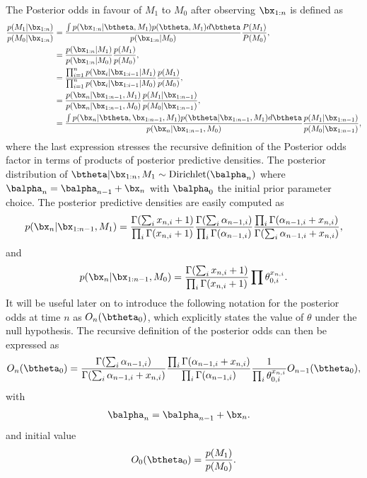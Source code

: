 \documentclass[11pt]{article}
\begin{document}
The Posterior odds in favour of $M_1$ to $M_0$ after observing $\bx_{1:n}$ is defined as
\begin{align}
  \label{eq:general_posterior_odds}
  \frac{p(M_1|\bx_{1:n})}{p(M_0|\bx_{1:n})}  &= \frac{\int p(\bx_{1:n}|\btheta,M_1)p(\btheta,M_1)d\btheta}{p(\bx_{1:n}|M_0)}\frac{P(M_1)}{P(M_0)},\\
                      &=\frac{p(\bx_{1:n}|M_1)}{p(\bx_{1:n}|M_0)}\frac{p(M_1)}{p(M_0)},\\
                      &=\frac{\prod_{i=1}^{n}p(\bx_i|\bx_{1:i-1}|M_1)}{\prod_{i=1}^{n}p(\bx_i|\bx_{1:i-1}|M_0)}\frac{p(M_1)}{p(M_0)},\\
                      &=\frac{p(\bx_n|\bx_{1:n-1},M_1)}{p(\bx_n|\bx_{1:n-1},M_0)} \frac{p(M_1|\bx_{1:n-1})}{p(M_0|\bx_{1:n-1})},\\
    &=\frac{\int p(\bx_n|\btheta,\bx_{1:n-1},M_1)p(\btheta|\bx_{1:n-1},M_1)d\btheta}{p(\bx_n|\bx_{1:n-1},M_0)}  \frac{p(M_1|\bx_{1:n-1})}{p(M_0|\bx_{1:n-1})} ,
\end{align}
where the last expression stresses the recursive definition of the Posterior odds factor in terms of products of posterior predictive densities.
The posterior distribution of $\btheta| \bx_{1:n}, M_1 \sim \text{Dirichlet}(\balpha_n)$ where $\balpha_n = \balpha_{n-1}+\bx_n$ with $\balpha_0$ the initial prior parameter choice.
The posterior predictive densities are easily computed as
\begin{equation}
  \label{eq:posterior_predictive_m1}
   p(\bx_n|\bx_{1:n-1},M_1) = \frac{ \Gamma(\sum_i x_{n,i}+ 1)}{\prod_i \Gamma(x_{n,i} + 1)} \frac{\Gamma(\sum_i \alpha_{n-1,i})}{\prod_i \Gamma(\alpha_{n-1,i})} \frac{\prod_i \Gamma(\alpha_{n-1,i} + x_{n,i})}{\Gamma(\sum_i \alpha_{n-1,i} + x_{n,i})},
\end{equation}
and
\begin{equation}
  \label{eq:posterior_predictive_m2}
   p(\bx_n|\bx_{1:n-1},M_0) = \frac{ \Gamma(\sum_i x_{n,i} + 1)}{\prod_i \Gamma(x_{n,i} + 1)} \prod \theta_{0,i}^{x_{n,i}}.
 \end{equation}
 It will be useful later on to introduce the following notation for the posterior odds at time $n$ as $O_n(\btheta_0)$, which explicitly states the value of $\theta$ under the null hypothesis.
The recursive definition of the posterior odds can then be expressed as
\begin{align}
  O_{n}(\btheta_0) &= \frac{\Gamma(\sum_i \alpha_{n-1,i})}{\Gamma(\sum_i \alpha_{n-1,i} +  x_{n,i})} \frac{\prod_i \Gamma(\alpha_{n-1,i} + x_{n,i})}{\prod_i \Gamma(\alpha_{n-1,i})} \frac{1}{\prod_i \theta_{0,i}^{x_{n,i}}}  O_{n-1}(\btheta_0),\\
\end{align}
with
\begin{align}
  \label{eq:alpha_update}
  \balpha_{n}&= \balpha_{n-1}+\bx_n.
\end{align}
and initial value
\begin{align}
  \label{eq:bayes_factor_seed}
O_0(\btheta_0) = \frac{p(M_1)}{p(M_0)}.
\end{align}
\end{document}
